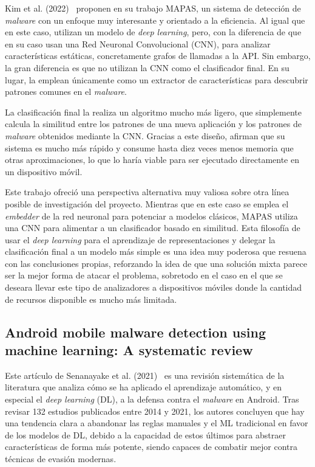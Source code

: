 Kim et al. (2022)~\cite{kim2022mapas} proponen en su trabajo MAPAS, un sistema de detección de \textit{malware} con un enfoque muy interesante y orientado a la eficiencia. Al igual que en este caso, utilizan un modelo de \textit{deep learning}, pero, con la diferencia de que en su caso usan una Red Neuronal Convolucional (CNN), para analizar características estáticas, concretamente grafos de llamadas a la API. Sin embargo, la gran diferencia es que no utilizan la CNN como el clasificador final. En su lugar, la emplean únicamente como un extractor de características para descubrir patrones comunes en el \textit{malware}.

La clasificación final la realiza un algoritmo mucho más ligero, que simplemente calcula la similitud entre los patrones de una nueva aplicación y los patrones de \textit{malware} obtenidos mediante la CNN. Gracias a este diseño, afirman que su sistema es mucho más rápido y consume hasta diez veces menos memoria que otras aproximaciones, lo que lo haría viable para ser ejecutado directamente en un dispositivo móvil.

Este trabajo ofreció una perspectiva alternativa muy valiosa sobre otra línea posible de investigación del proyecto. Mientras que en este caso se emplea el \textit{embedder} de la red neuronal para potenciar a modelos clásicos, MAPAS utiliza una CNN para alimentar a un clasificador basado en similitud. Esta filosofía de usar el \textit{deep learning} para el aprendizaje de representaciones y delegar la clasificación final a un modelo más simple es una idea muy poderosa que resuena con las conclusiones propias, reforzando la idea de que una solución mixta parece ser la mejor forma de atacar el problema, sobretodo en el caso en el que se deseara llevar este tipo de analizadores a dispositivos móviles donde la cantidad de recursos disponible es mucho más limitada.

\subsection{Android mobile malware detection using machine learning: A systematic review}

Este artículo de Senanayake et al. (2021)~\cite{senanayake2021android} es una revisión sistemática de la literatura que analiza cómo se ha aplicado el aprendizaje automático, y en especial el \textit{deep learning} (DL), a la defensa contra el \textit{malware} en Android. Tras revisar 132 estudios publicados entre 2014 y 2021, los autores concluyen que hay una tendencia clara a abandonar las reglas manuales y el ML tradicional en favor de los modelos de DL, debido a la capacidad de estos últimos para abstraer características de forma más potente, siendo capaces de combatir mejor contra técnicas de evasión modernas.

